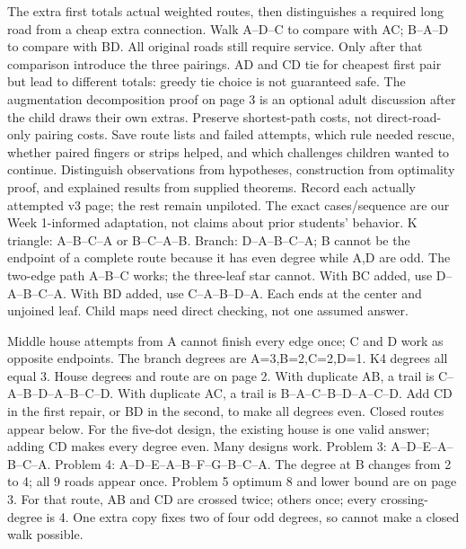 \documentclass[11pt]{article}
\begin{document}
The extra first totals actual weighted routes, then distinguishes a required long road from a cheap extra connection. Walk A--D--C to compare with AC; B--A--D to compare with BD. All original roads still require service. Only after that comparison introduce the three pairings. AD and CD tie for cheapest first pair but lead to different totals: greedy tie choice is not guaranteed safe. The augmentation decomposition proof on page 3 is an optional adult discussion after the child draws their own extras. Preserve shortest-path costs, not direct-road-only pairing costs.
Save route lists and failed attempts, which rule needed rescue, whether paired fingers or strips helped, and which challenges children wanted to continue. Distinguish observations from hypotheses, construction from optimality proof, and explained results from supplied theorems. Record each actually attempted v3 page; the rest remain unpiloted. The exact cases/sequence are our Week 1-informed adaptation, not claims about prior students' behavior.
\newpage
{}
K triangle: A--B--C--A or B--C--A--B. Branch: D--A--B--C--A; B cannot be the endpoint of a complete route because it has even degree while A,D are odd. The two-edge path A--B--C works; the three-leaf star cannot. With BC added, use D--A--B--C--A. With BD added, use C--A--B--D--A. Each ends at the center and unjoined leaf. Child maps need direct checking, not one assumed answer.

Middle house attempts from A cannot finish every edge once; C and D work as opposite endpoints. The branch degrees are A=3,B=2,C=2,D=1. K4 degrees all equal 3. House degrees and route are on page 2. With duplicate AB, a trail is C--A--B--D--A--B--C--D. With duplicate AC, a trail is B--A--C--B--D--A--C--D. Add CD in the first repair, or BD in the second, to make all degrees even. Closed routes appear below. For the five-dot design, the existing house is one valid answer; adding CD makes every degree even. Many designs work.
Problem 3: A--D--E--A--B--C--A. Problem 4: A--D--E--A--B--F--G--B--C--A. The degree at B changes from 2 to 4; all 9 roads appear once. Problem 5 optimum 8 and lower bound are on page 3. For that route, AB and CD are crossed twice; others once; every crossing-degree is 4. One extra copy fixes two of four odd degrees, so cannot make a closed walk possible.
\end{document}
